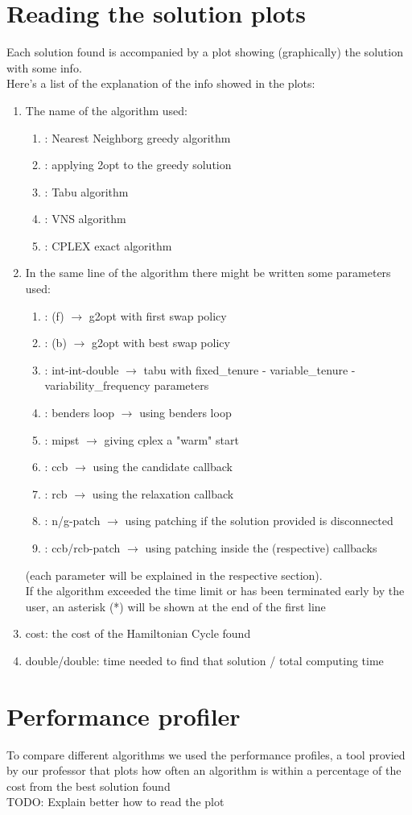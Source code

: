 \section{Reading the solution plots}
Each solution found is accompanied by a plot showing (graphically) the solution with some info.\\
Here's a list of the explanation of the info showed in the plots:
\begin{enumerate}
    \item The name of the algorithm used:
    \begin{enumerate}
        \item[greedy]: Nearest Neighborg greedy algorithm
        \item[g2opt]: applying 2opt to the greedy solution
        \item[tabu]: Tabu algorithm
        \item[vns]: VNS algorithm
        \item[cplex]: CPLEX exact algorithm
    \end{enumerate}
    \item In the same line of the algorithm there might be written some parameters used:
    \begin{enumerate}
        \item[g2opt]: (f) $\rightarrow$ g2opt with first swap policy
        \item[g2opt]: (b) $\rightarrow$ g2opt with best swap policy
        \item[tabu]: int-int-double $\rightarrow$ tabu with fixed\_tenure - variable\_tenure - variability\_frequency parameters
        \item[cplex]: benders loop $\rightarrow$ using benders loop
        \item[cplex]: mipst $\rightarrow$ giving cplex a "warm" start
        \item[cplex]: ccb $\rightarrow$ using the candidate callback
        \item[cplex]: rcb $\rightarrow$ using the relaxation callback
        \item[cplex]: n/g-patch $\rightarrow$ using patching if the solution provided is disconnected
        \item[cplex]: ccb/rcb-patch $\rightarrow$ using patching inside the (respective) callbacks
    \end{enumerate}
    (each parameter will be explained in the respective section).\\
    If the algorithm exceeded the time limit or has been terminated early by the user, an asterisk (*) will be shown at the end of the first line
    \item cost: the cost of the Hamiltonian Cycle found
    \item double/double: time needed to find that solution / total computing time
\end{enumerate}

\section{Performance profiler}
To compare different algorithms we used the performance profiles, a tool provied by our professor that plots how often an algorithm is within a percentage of the cost from the best solution found\\
TODO: Explain better how to read the plot\\